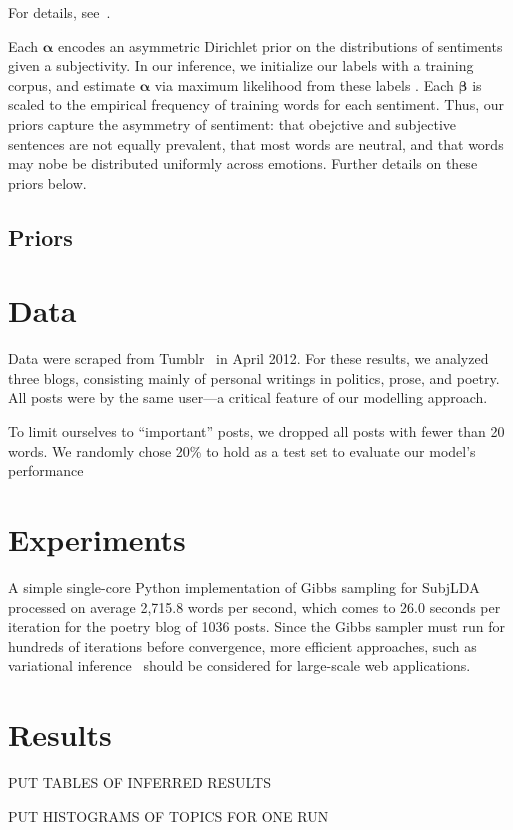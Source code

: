 \documentclass{article}
\begin{document}
For details, see~\citep{lin03}.

Each $\mathbf{\alpha}$ encodes an asymmetric Dirichlet prior on the
distributions of sentiments given a subjectivity. In our inference,
we initialize our labels with a training corpus, and estimate
$\mathbf{\alpha}$ via maximum likelihood from these labels
\citep{minka00}. Each $\mathbf{\beta}$ is scaled to the empirical
frequency of training words for each sentiment. Thus, our priors
capture the asymmetry of sentiment: that obejctive and subjective
sentences are not equally prevalent, that most words are neutral,
and that words may nobe be distributed uniformly across emotions.
Further details on these priors below.

\subsection{Priors}

\section{Data}
Data were scraped from Tumblr~\citep{tumblr} in April 2012. For
these results, we analyzed three blogs, consisting mainly of personal
writings in politics, prose, and poetry. All posts were by the same
user---a critical feature of our modelling approach.

To limit ourselves to ``important'' posts, we dropped all posts
with fewer than 20 words. We randomly chose 20\% to hold as a test
set to evaluate our model's performance


\section{Experiments}
A simple single-core Python implementation of Gibbs sampling for SubjLDA processed on average 2,715.8 words per second, which comes to 26.0 seconds per iteration for the poetry blog of 1036 posts. Since the Gibbs sampler must run for hundreds of iterations before convergence, more efficient approaches, such as variational inference~\citep{winn2005} should be considered for large-scale web applications.

\section{Results}

PUT TABLES OF INFERRED RESULTS

PUT HISTOGRAMS OF TOPICS FOR ONE RUN
\end{document}
